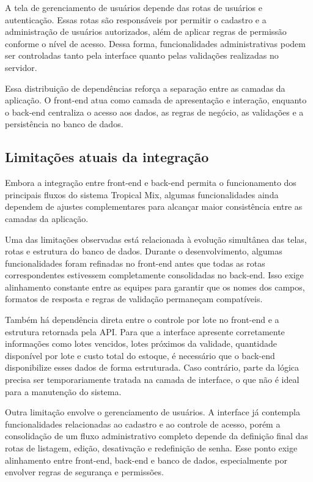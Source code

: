 A tela de gerenciamento de usuários depende das rotas de usuários e autenticação. Essas rotas são responsáveis por permitir o cadastro e a administração de usuários autorizados, além de aplicar regras de permissão conforme o nível de acesso. Dessa forma, funcionalidades administrativas podem ser controladas tanto pela interface quanto pelas validações realizadas no servidor.

Essa distribuição de dependências reforça a separação entre as camadas da aplicação. O front-end atua como camada de apresentação e interação, enquanto o back-end centraliza o acesso aos dados, as regras de negócio, as validações e a persistência no banco de dados.

\subsection{Limitações atuais da integração}

Embora a integração entre front-end e back-end permita o funcionamento dos principais fluxos do sistema Tropical Mix, algumas funcionalidades ainda dependem de ajustes complementares para alcançar maior consistência entre as camadas da aplicação.

Uma das limitações observadas está relacionada à evolução simultânea das telas, rotas e estrutura do banco de dados. Durante o desenvolvimento, algumas funcionalidades foram refinadas no front-end antes que todas as rotas correspondentes estivessem completamente consolidadas no back-end. Isso exige alinhamento constante entre as equipes para garantir que os nomes dos campos, formatos de resposta e regras de validação permaneçam compatíveis.

Também há dependência direta entre o controle por lote no front-end e a estrutura retornada pela API. Para que a interface apresente corretamente informações como lotes vencidos, lotes próximos da validade, quantidade disponível por lote e custo total do estoque, é necessário que o back-end disponibilize esses dados de forma estruturada. Caso contrário, parte da lógica precisa ser temporariamente tratada na camada de interface, o que não é ideal para a manutenção do sistema.

Outra limitação envolve o gerenciamento de usuários. A interface já contempla funcionalidades relacionadas ao cadastro e ao controle de acesso, porém a consolidação de um fluxo administrativo completo depende da definição final das rotas de listagem, edição, desativação e redefinição de senha. Esse ponto exige alinhamento entre front-end, back-end e banco de dados, especialmente por envolver regras de segurança e permissões.

